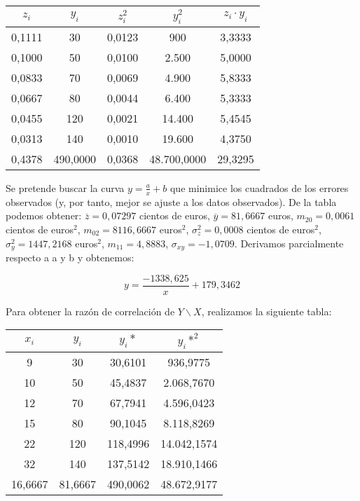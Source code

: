 \begin{center}
	\begin{tabular}{ c|c|c|c|c }
	
	$z_i$ & $y_i$ & $z_i^2$ & $y_i^2$ & $z_i·y_i$ \\ \hline
	0,1111 & 30 & 0,0123 & 900 & 3,3333 \\ 
	0,1000 & 50 & 0,0100 & 2.500 & 5,0000 \\ 
	0,0833 & 70 & 0,0069 & 4.900 & 5,8333 \\ 
	0,0667 & 80 & 0,0044 & 6.400 & 5,3333 \\ 
	0,0455 & 120 & 0,0021 & 14.400 & 5,4545 \\ 
	0,0313 & 140 & 0,0010 & 19.600 & 4,3750 \\ \hline
	0,4378 & 490,0000 & 0,0368 & 48.700,0000 & 29,3295 \\ 
\end{tabular}
\end{center}

Se pretende buscar la curva $y = \frac{a}{x} + b$ que minimice los cuadrados de los errores observados (y, por tanto, mejor se ajuste a los datos observados). De la tabla podemos obtener: $\overline{z}= 0,07297$ cientos de euros, $\overline{y}= 81,6667$ euros, $m_{20} = 0,0061$ cientos de euros$^2$, $m_{02} = 8116,6667$ euros$^2$, $\sigma_z^2= 0,0008$ cientos de euros$^2$, $\sigma_y^2= 1447,2168$ euros$^2$, $m_{11} = 4,8883$, $\sigma_{xy} =  -1,0709$. Derivamos parcialmente respecto a a y b y obtenemos:

$$y=\frac{-1338,625}{x}+179,3462$$

Para obtener la razón de correlación de $Y\backslash X$, realizamos la siguiente tabla:

\begin{center}
	\begin{tabular}{ c c|c c }
	
	$x_i$ & $y_i$ & $y_i*$ & $y_i*^2$ \\ \hline
	9 & 30 & 30,6101 & 936,9775 \\ 
	10 & 50 & 45,4837 & 2.068,7670 \\ 
	12 & 70 & 67,7941 & 4.596,0423 \\ 
	15 & 80 & 90,1045 & 8.118,8269 \\ 
	22 & 120 & 118,4996 & 14.042,1574 \\ 
	32 & 140 & 137,5142 & 18.910,1466 \\ \hline
	16,6667 & 81,6667 & 490,0062 & 48.672,9177 \\ 
\end{tabular}
\end{center}


